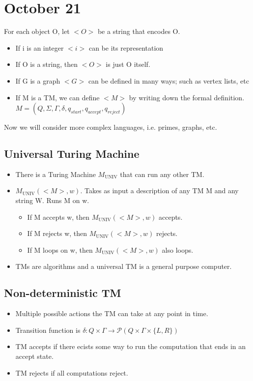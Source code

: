 \section{October 21}
For each object O, let $<O>$ be a string that encodes O. 
\begin{itemize}
  \item If i is an integer $<i>$ can be its representation
  \item If O is a string, then $<O>$ is just O itself.
  \item If G is a graph $<G>$ can be defined in many ways; such as vertex lists, etc
  \item If M is a TM, we can define $<M>$ by writing down the formal definition. $M = (Q, \Sigma, \Gamma, \delta, q_{start}, q_{accept}, q_{reject})$
\end{itemize}
Now we will consider more complex languages, i.e. primes, graphs, etc.

\subsection{Universal Turing Machine}
\begin{itemize}
  \item There is a Turing Machine $M_{\text{UNIV}}$ that can run any other TM.
  \item $M_{\text{UNIV}}(<M>, w)$. Takes as input a description of any TM M and any string W. Runs M on w.
  \begin{itemize}
    \item If M accepts w, then $M_{\text{UNIV}}(<M>, w)$ accepts.
    \item If M rejects w, then $M_{\text{UNIV}}(<M>, w)$ rejects.
    \item If M loops on w, then $M_{\text{UNIV}}(<M>, w)$ also loops.
  \end{itemize}
  \item TMs are algorithms and a universal TM is a general purpose computer.
\end{itemize}

\subsection{Non-deterministic TM}
\begin{itemize}
  \item Multiple possible actions the TM can take at any point in time.
  \item Transition function is $\delta : Q \times \Gamma \to \mathcal{P}(Q \times \Gamma \times \{L, R\})$
  \item TM accepts if there ecists some way to run the computation that ends in an accept state.
  \item TM rejects if all computations reject.
\end{itemize}


